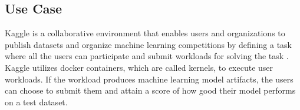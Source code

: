 %
% 

\subsection{Use Case}\label{subsec-motivational-example}
Kaggle is a collaborative environment that enables users and organizations to publish datasets and organize machine learning competitions by defining a task where all the users can participate and submit workloads for solving the task \cite{kagglewebsite}.
Kaggle utilizes docker containers, which are called kernels, to execute user workloads.
If the workload produces machine learning model artifacts, the users can choose to submit them and attain a score of how good their model performs on a test dataset.

